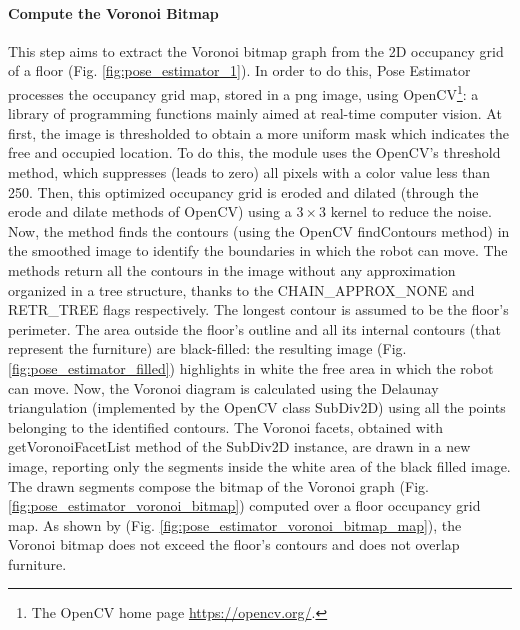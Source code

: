 \paragraph{Compute the Voronoi Bitmap} This step aims to extract the Voronoi bitmap graph from the 2D occupancy grid of a floor (Fig. \ref{fig:pose_estimator_1}). In order to do this, Pose Estimator processes the occupancy grid map, stored in a \textsf{png} image, using OpenCV\footnote{The OpenCV home page \url{https://opencv.org/}.}: a library of programming functions mainly aimed at real-time computer vision. At first, the image is thresholded to obtain a more uniform mask which indicates the free and occupied location. To do this, the module uses the OpenCV's \textsf{threshold} method, which suppresses (leads to zero) all pixels with a color value less than 250. Then, this optimized occupancy grid is eroded and dilated (through the \textsf{erode} and \textsf{dilate} methods of OpenCV) using a $3 \times 3$ kernel to reduce the noise. Now, the method finds the contours (using the OpenCV \textsf{findContours} method) in the smoothed image to identify the boundaries in which the robot can move. The methods return all the contours in the image without any approximation organized in a tree structure, thanks to the \textsf{CHAIN\_APPROX\_NONE} and \textsf{RETR\_TREE} flags respectively. The longest contour is assumed to be the floor's perimeter. The area outside the floor's outline and all its internal contours (that represent the furniture) are black-filled: the resulting image (Fig. \ref{fig:pose_estimator_filled}) highlights in white the free area in which the robot can move. Now, the Voronoi diagram is calculated using the Delaunay triangulation \cite{delaunayproof} (implemented by the OpenCV class \textsf{SubDiv2D}) using all the points belonging to the identified contours.  The Voronoi facets, obtained with \textsf{getVoronoiFacetList} method of the \textsf{SubDiv2D} instance, are drawn in a new image, reporting only the segments inside the white area of the black filled image. The drawn segments compose the bitmap of the Voronoi graph (Fig. \ref{fig:pose_estimator_voronoi_bitmap}) computed over a floor occupancy grid map. As shown by (Fig. \ref{fig:pose_estimator_voronoi_bitmap_map}), the Voronoi bitmap does not exceed the floor's contours and does not overlap furniture. 

